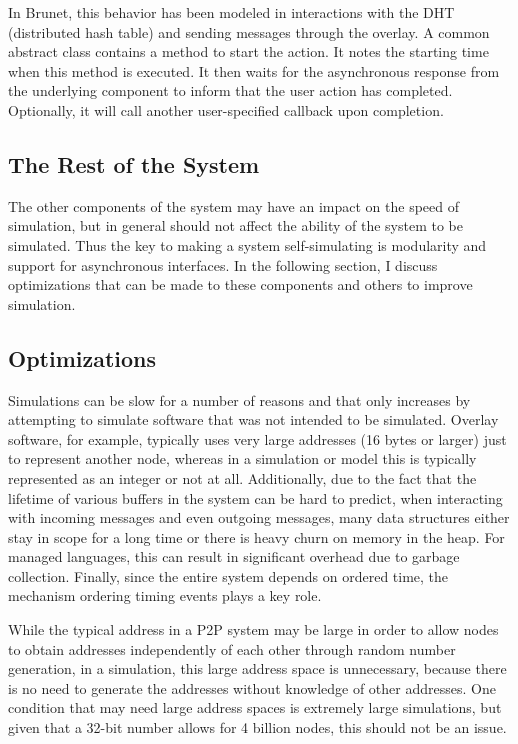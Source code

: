 In Brunet, this behavior has been modeled in interactions with the DHT
(distributed hash table) and sending messages through the overlay.  A common
abstract class contains a method to start the action.  It notes the starting
time when this method is executed.  It then waits for the asynchronous response
from the underlying component to inform that the user action has completed.
Optionally, it will call another user-specified callback upon completion.

\subsection{The Rest of the System}

The other components of the system may have an impact on the speed of
simulation, but in general should not affect the ability of the system to be
simulated.  Thus the key to making a system self-simulating is modularity and
support for asynchronous interfaces.  In the following section, I discuss
optimizations that can be made to these components and others to improve
simulation.

\subsection{Optimizations}

Simulations can be slow for a number of reasons and that only increases by
attempting to simulate software that was not intended to be simulated.  Overlay
software, for example, typically uses very large addresses (16 bytes or larger)
just to represent another node, whereas in a simulation or model this is
typically represented as an integer or not at all.  Additionally, due to the
fact that the lifetime of various buffers in the system can be hard to predict,
when interacting with incoming messages and even outgoing messages, many data
structures either stay in scope for a long time or there is heavy churn on
memory in the heap.  For managed languages, this can result in significant
overhead due to garbage collection.  Finally, since the entire system depends
on ordered time, the mechanism ordering timing events plays a key role.

While the typical address in a P2P system may be large in order to allow nodes
to obtain addresses independently of each other through random number
generation, in a simulation, this large address space is unnecessary, because
there is no need to generate the addresses without knowledge of other
addresses.  One condition that may need large address spaces is extremely large
simulations, but given that a 32-bit number allows for 4 billion nodes, this
should not be an issue.

